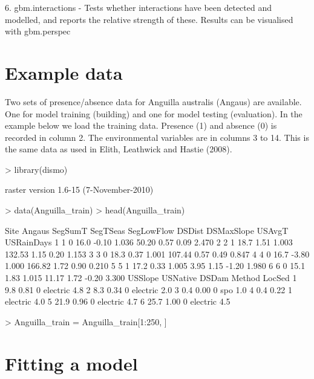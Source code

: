 \documentclass{article}
\begin{document}
6. gbm.interactions - Tests whether interactions have been detected and modelled, and reports the relative strength of these. Results can be visualised with gbm.perspec 


\section{Example data}

Two sets of presence/absence data for Anguilla australis (Angaus) are available. One for model training (building) and one for model testing (evaluation). In the example below we load the training data. Presence (1) and absence (0) is recorded in column 2. The environmental variables are in columns 3 to 14. This is the same data as used in Elith, Leathwick and Hastie (2008). 


\begin{Schunk}
\begin{Sinput}
> library(dismo)
\end{Sinput}
\begin{Soutput}
raster version 1.6-15 (7-November-2010)
\end{Soutput}
\begin{Sinput}
> data(Anguilla_train)
> head(Anguilla_train)
\end{Sinput}
\begin{Soutput}
  Site Angaus SegSumT SegTSeas SegLowFlow DSDist DSMaxSlope USAvgT USRainDays
1    1      0    16.0    -0.10      1.036  50.20       0.57   0.09      2.470
2    2      1    18.7     1.51      1.003 132.53       1.15   0.20      1.153
3    3      0    18.3     0.37      1.001 107.44       0.57   0.49      0.847
4    4      0    16.7    -3.80      1.000 166.82       1.72   0.90      0.210
5    5      1    17.2     0.33      1.005   3.95       1.15  -1.20      1.980
6    6      0    15.1     1.83      1.015  11.17       1.72  -0.20      3.300
  USSlope USNative DSDam   Method LocSed
1     9.8     0.81     0 electric    4.8
2     8.3     0.34     0 electric    2.0
3     0.4     0.00     0      spo    1.0
4     0.4     0.22     1 electric    4.0
5    21.9     0.96     0 electric    4.7
6    25.7     1.00     0 electric    4.5
\end{Soutput}
\begin{Sinput}
> Anguilla_train = Anguilla_train[1:250, ]
\end{Sinput}
\end{Schunk}


\section{Fitting a model}
\end{document}
